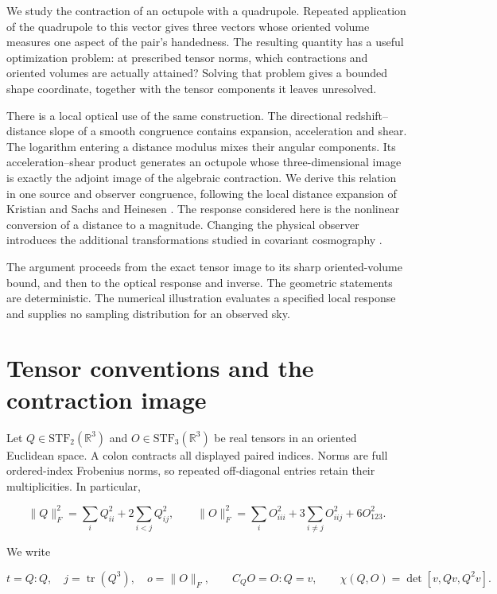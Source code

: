 \documentclass[aps,prd,reprint,onecolumn,11pt,nofootinbib,notitlepage]{revtex4-2}
\begin{document}
We study the contraction of an octupole with a quadrupole. Repeated application of the quadrupole to this vector gives three vectors whose oriented volume measures one aspect of the pair's handedness. The resulting quantity has a useful optimization problem: at prescribed tensor norms, which contractions and oriented volumes are actually attained? Solving that problem gives a bounded shape coordinate, together with the tensor components it leaves unresolved.

There is a local optical use of the same construction. The directional redshift--distance slope of a smooth congruence contains expansion, acceleration and shear. The logarithm entering a distance modulus mixes their angular components. Its acceleration--shear product generates an octupole whose three-dimensional image is exactly the adjoint image of the algebraic contraction. We derive this relation in one source and observer congruence, following the local distance expansion of Kristian and Sachs and Heinesen \cite{KristianSachs1966,Heinesen2021}. The response considered here is the nonlinear conversion of a distance to a magnitude. Changing the physical observer introduces the additional transformations studied in covariant cosmography \cite{Maartens2024}.

The argument proceeds from the exact tensor image to its sharp oriented-volume bound, and then to the optical response and inverse. The geometric statements are deterministic. The numerical illustration evaluates a specified local response and supplies no sampling distribution for an observed sky.

\section{Tensor conventions and the contraction image}

Let \(Q\in\mathrm{STF}_2(\mathbb R^3)\) and \(O\in\mathrm{STF}_3(\mathbb R^3)\) be real tensors in an oriented Euclidean space. A colon contracts all displayed paired indices. Norms are full ordered-index Frobenius norms, so repeated off-diagonal entries retain their multiplicities. In particular,

\begin{equation}
 \|Q\|_F^2=\sum_iQ_{ii}^2+2\sum_{i<j}Q_{ij}^2,\qquad
 \|O\|_F^2=\sum_iO_{iii}^2+3\sum_{i\ne j}O_{iij}^2+6O_{123}^2.
 \tag{1}
\end{equation}

We write

\begin{equation}
 t=Q:Q,\quad j=\operatorname{tr}(Q^3),\quad o=\|O\|_F,\qquad
 C_QO=O:Q=v,\qquad \chi(Q,O)=\det[v,Qv,Q^2v].
 \tag{2}
\end{equation}
\end{document}
